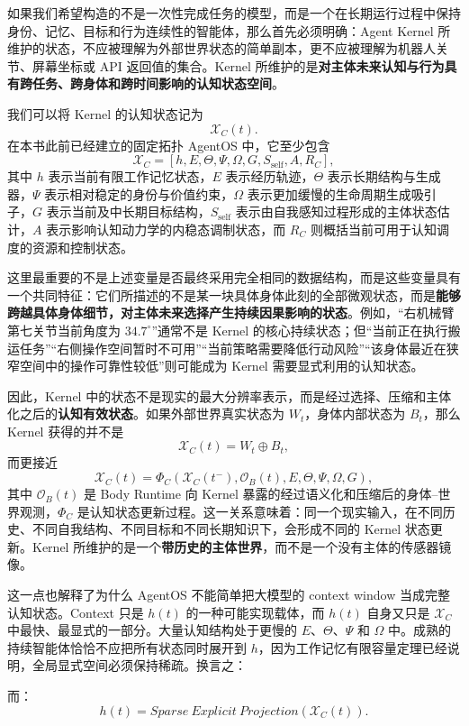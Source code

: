 如果我们希望构造的不是一次性完成任务的模型，而是一个在长期运行过程中保持身份、记忆、目标和行为连续性的智能体，那么首先必须明确：Agent Kernel 所维护的状态，不应被理解为外部世界状态的简单副本，更不应被理解为机器人关节、屏幕坐标或 API 返回值的集合。Kernel 所维护的是\textbf{对主体未来认知与行为具有跨任务、跨身体和跨时间影响的认知状态空间}。

我们可以将 Kernel 的认知状态记为
\[
\mathcal X_C(t).
\]
在本书此前已经建立的固定拓扑 AgentOS 中，它至少包含
\[
\mathcal X_C
=
\left[
h,
E,
\Theta,
\Psi,
\Omega,
G,
S_{\mathrm{self}},
A,
R_C
\right],
\]
其中 $h$ 表示当前有限工作记忆状态，$E$ 表示经历轨迹，$\Theta$ 表示长期结构与生成器，$\Psi$ 表示相对稳定的身份与价值约束，$\Omega$ 表示更加缓慢的生命周期生成吸引子，$G$ 表示当前及中长期目标结构，$S_{\mathrm{self}}$ 表示由自我感知过程形成的主体状态估计，$A$ 表示影响认知动力学的内稳态调制状态，而 $R_C$ 则概括当前可用于认知调度的资源和控制状态。

这里最重要的不是上述变量是否最终采用完全相同的数据结构，而是这些变量具有一个共同特征：它们所描述的不是某一块具体身体此刻的全部微观状态，而是\textbf{能够跨越具体身体细节，对主体未来选择产生持续因果影响的状态}。例如，“右机械臂第七关节当前角度为 $34.7^\circ$”通常不是 Kernel 的核心持续状态；但“当前正在执行搬运任务”“右侧操作空间暂时不可用”“当前策略需要降低行动风险”“该身体最近在狭窄空间中的操作可靠性较低”则可能成为 Kernel 需要显式利用的认知状态。

因此，Kernel 中的状态不是现实的最大分辨率表示，而是经过选择、压缩和主体化之后的\textbf{认知有效状态}。如果外部世界真实状态为 $W_t$，身体内部状态为 $B_t$，那么 Kernel 获得的并不是
\[
\mathcal X_C(t)=W_t\oplus B_t,
\]
而更接近
\[
\mathcal X_C(t)
=
\Phi_C
\left(
\mathcal X_C(t^-),
\mathcal O_B(t),
E,
\Theta,
\Psi,
\Omega,
G
\right),
\]
其中 $\mathcal O_B(t)$ 是 Body Runtime 向 Kernel 暴露的经过语义化和压缩后的身体--世界观测，$\Phi_C$ 是认知状态更新过程。这一关系意味着：同一个现实输入，在不同历史、不同自我结构、不同目标和不同长期知识下，会形成不同的 Kernel 状态更新。Kernel 所维护的是一个\textbf{带历史的主体世界}，而不是一个没有主体的传感器镜像。

这一点也解释了为什么 AgentOS 不能简单把大模型的 context window 当成完整认知状态。Context 只是 $h(t)$ 的一种可能实现载体，而 $h(t)$ 自身又只是 $\mathcal X_C$ 中最快、最显式的一部分。大量认知结构处于更慢的 $E$、$\Theta$、$\Psi$ 和 $\Omega$ 中。成熟的持续智能体恰恰不应把所有状态同时展开到 $h$，因为工作记忆有限容量定理已经说明，全局显式空间必须保持稀疏。换言之：
\begin{statementbox}
\centering
{}
\end{statementbox}
而：
\[
\boxed{
h(t)
=
Sparse\ Explicit\ Projection
\left(
\mathcal X_C(t)
\right).
}
\]

